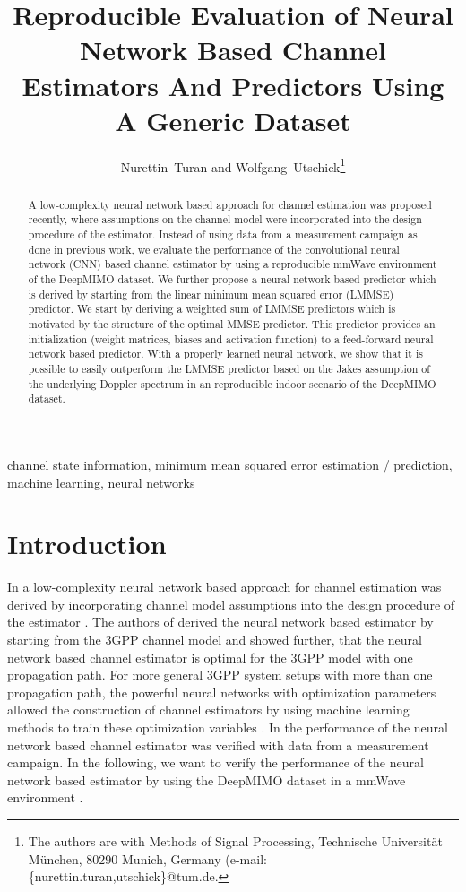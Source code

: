 \documentclass[12pt, draftclsnofoot, onecolumn]{IEEEtran}
\begin{document}
\title{Reproducible Evaluation of Neural Network Based Channel Estimators And Predictors Using A Generic Dataset}
\author{Nurettin~Turan and Wolfgang~Utschick\thanks{The authors are with Methods of Signal Processing, Technische Universit\"at M\"unchen, 80290 Munich, Germany (e-mail: \{nurettin.turan,utschick\}@tum.de.}
}
\markboth{}{}
	
\maketitle

\begin{abstract}
A low-complexity neural network based approach for channel estimation was proposed recently, where assumptions on the channel model were incorporated into the design procedure of the estimator. Instead of using data from a measurement campaign as done in previous work, we evaluate the performance of the convolutional neural network (CNN) based channel estimator by using a reproducible mmWave environment of the DeepMIMO dataset. We further propose a neural network based predictor which is derived by starting from the linear minimum mean squared error (LMMSE) predictor. We start by deriving a weighted sum of LMMSE predictors which is motivated by the structure of the optimal MMSE predictor. This predictor provides an initialization (weight matrices, biases and activation function) to a feed-forward neural network based predictor. With a properly learned neural network, we show that it is possible to easily outperform the LMMSE predictor based on the Jakes assumption of the underlying Doppler spectrum in an reproducible indoor scenario of the DeepMIMO dataset.
\end{abstract}

\begin{IEEEkeywords}
channel state information, minimum mean squared error estimation / prediction, machine learning, neural networks
\end{IEEEkeywords}

\section{Introduction}
\label{sec:intro}

In \cite{Neumann} a low-complexity neural network based approach for channel estimation was derived by incorporating channel model assumptions into the design procedure of the estimator \cite{Hellings}. The authors of \cite{Neumann} derived the neural network based estimator by starting from the 3GPP channel model and showed further, that the neural network based channel estimator is optimal for the 3GPP model with one propagation path. For more general 3GPP system setups with more than one propagation path, the powerful neural networks with optimization parameters allowed the construction of channel estimators by using machine learning methods to train these optimization variables \cite{Hellings}. In \cite{Hellings} the performance of the neural network based channel estimator was verified with data from a measurement campaign. In the following, we want to verify the performance of the neural network based estimator by using the DeepMIMO dataset in a mmWave environment \cite{Alkhateeb2019}. 
\end{document}
